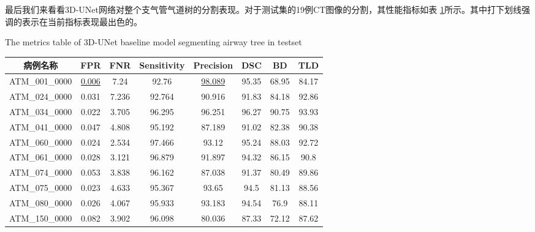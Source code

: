 最后我们来看看3D-UNet网络对整个支气管气道树的分割表现。对于测试集的19例CT图像的分割，其性能指标如表
\ref{tbl:testset_airway_tree_metrics}所示。其中打下划线强调的表示在当前指标表现最出色的。
\begin{table}[ht]
        {The metrics table of 3D-UNet baseline model segmenting airway tree in testset}
    \label{tbl:testset_airway_tree_metrics}
    \centering
    \begin{tabular}{cccccccc}
        \toprule
        病例名称          & FPR           & FNR            & Sensitivity     & Precision      & DSC           & BD            & TLD           \\
        \midrule
        ATM\_001\_0000 & \uline{0.006} & 7.24           & 92.76           & \uline{98.089} & 95.35         & 68.95         & 84.17         \\
        ATM\_024\_0000 & 0.031         & 7.236          & 92.764          & 90.916         & 91.83         & 84.18         & 92.86         \\
        ATM\_034\_0000 & 0.022         & 3.705          & 96.295          & 96.251         & 96.27         & 90.75         & 93.93         \\
        ATM\_041\_0000 & 0.047         & 4.808          & 95.192          & 87.189         & 91.02         & 82.38         & 90.38         \\
        ATM\_060\_0000 & 0.024         & 2.534          & 97.466          & 93.12          & 95.24         & 88.03         & 92.72         \\
        ATM\_061\_0000 & 0.028         & 3.121          & 96.879          & 91.897         & 94.32         & 86.15         & 90.8          \\
        ATM\_074\_0000 & 0.053         & 3.838          & 96.162          & 87.038         & 91.37         & 80.49         & 89.86         \\
        ATM\_075\_0000 & 0.023         & 4.633          & 95.367          & 93.65          & 94.5          & 81.13         & 88.56         \\
        ATM\_080\_0000 & 0.026         & 4.067          & 95.933          & 93.183         & 94.54         & 76.9          & 88.11         \\
        ATM\_150\_0000 & 0.082         & 3.902          & 96.098          & 80.036         & 87.33         & 72.12         & 87.62         \\

\end{tabular}
\end{table}
